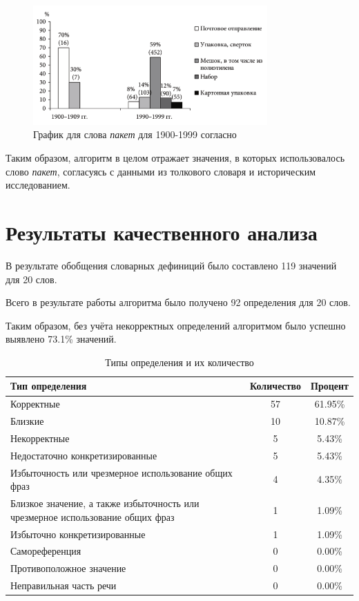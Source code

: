 \documentclass[LI,VKR]{HSEUniversity}
\begin{document}
\begin{figure}[H]
    \centering %
    \includegraphics[width=0.8\textwidth]{img/book/paket/1900-1999}
    \caption{График для слова \textit{пакет} для 1900-1999 согласно~\cite{TwoCenturies}}
\end{figure}

Таким образом, алгоритм в целом отражает значения, в которых использовалось
слово \textit{пакет}, согласуясь с данными из толкового словаря и историческим исследованием.

\section{Результаты качественного анализа}

В результате обобщения словарных дефиниций было составлено 119 значений для 20 слов.

Всего в результате работы алгоритма было получено 92 определения для 20 слов.

Таким образом, без учёта некорректных определений алгоритмом было успешно выявлено
73.1\% значений.

\begin{table}[H]
\centering
\caption{Типы определения и их количество}
\begin{tabular}{|>{\raggedright\arraybackslash}p{8cm}|c|c|}
\hline
\textbf{Тип определения} & \textbf{Количество} & \textbf{Процент} \\ \hline
Корректные & 57 & 61.95\% \\ \hline
Близкие & 10 & 10.87\% \\ \hline
Некорректные & 5 & 5.43\% \\ \hline
Недостаточно конкретизированные & 5 & 5.43\% \\ \hline
Избыточность или чрезмерное использование общих фраз & 4 & 4.35\% \\ \hline
Близкое значение, а также избыточность или чрезмерное использование общих фраз & 1 & 1.09\% \\ \hline
Избыточно конкретизированные & 1 & 1.09\% \\ \hline
Самореференция & 0 & 0.00\% \\ \hline
Противоположное значение & 0 & 0.00\% \\ \hline
Неправильная часть речи & 0 & 0.00\% \\ \hline
\end{tabular}
\end{table}
\end{document}

